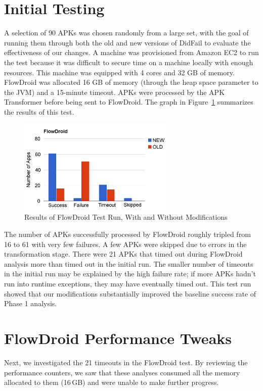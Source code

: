 \section{Initial Testing}
A selection of 90 APKs was chosen randomly from a large set, with the goal of running them through both the old and new versions of DidFail to evaluate the effectiveness of our changes.  A machine was provisioned from Amazon EC2 to run the test because it was difficult to secure time on a machine locally with enough resources.  This machine was equipped with 4 cores and 32 GB of memory.  FlowDroid was allocated 16 GB of memory (through the heap space parameter to the JVM) and a 15-minute timeout.  APKs were processed by the APK Transformer before being sent to FlowDroid.  The graph in Figure~\ref{fig:initial_phase1} summarizes the results of this test.

\begin{figure}[h]
	\centering
	\begin{minipage}{0.85\textwidth}
	\centering
	\includegraphics[width=0.66\textwidth]{flowdroid_success2.png}
	\caption[Results of FlowDroid Test Run on 90 Apps, With and Without Modifications]{Results of FlowDroid Test Run, With and Without Modifications}
	\label{fig:initial_phase1}
	\end{minipage}
\end{figure}

The number of APKs successfully processed by FlowDroid roughly tripled from 16 to 61 with very few failures. A few APKs were skipped due to errors in the transformation stage. There were 21 APKs that timed out during FlowDroid analysis more than timed out in the initial run.  The smaller number of timeouts in the initial run may be explained by the high failure rate; if more APKs hadn't run into runtime exceptions, they may have eventually timed out.  This test run showed that our modifications substantially improved the baseline success rate of Phase 1 analysis.

\section{FlowDroid Performance Tweaks}
Next, we investigated the 21 timeouts in the FlowDroid test.  By reviewing the performance counters, we saw that these analyses consumed all the memory allocated to them (16\,GB) and were unable to make further progress.

